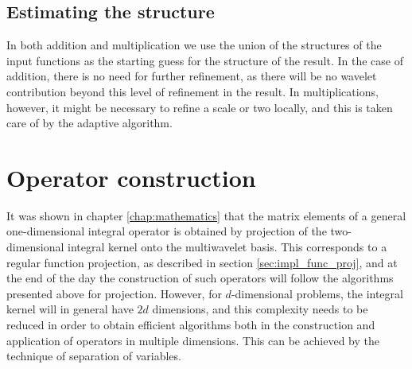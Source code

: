 \subsection{Estimating the \tree structure}
In both addition and multiplication we use the union of the \tree structures of
the input functions as the starting guess for the \tree structure of the result.
In the case of addition, there is no need for further refinement, as there will 
be no wavelet contribution beyond this level of refinement in the result. In 
multiplications, however, it might be necessary to refine a scale or two locally,
and this is taken care of by the adaptive algorithm.

\section{Operator construction}
It was shown in chapter \ref{chap:mathematics} that the matrix elements of a general
one-dimensional integral operator is obtained by projection of the two-dimensional
integral kernel onto the multiwavelet basis. This corresponds to a regular function
projection, as described in section \ref{sec:impl_func_proj}, and at the end of the 
day the construction of such operators will follow the algorithms presented above for
projection. However, for $d$-dimensional problems, the integral kernel will in general
have $2d$ dimensions, and this complexity needs to be reduced in order to obtain
efficient algorithms both in the construction and application of operators in multiple
dimensions. This can be achieved by the technique of separation of variables.


